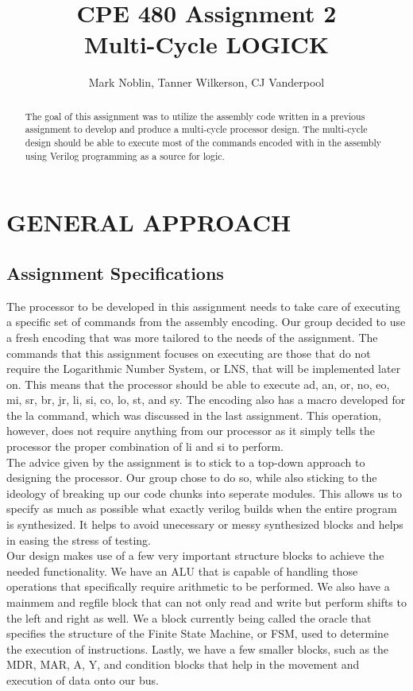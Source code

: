 \documentclass[journal]{IEEEtran}
\begin{document}
\title{CPE 480 Assignment 2\\Multi-Cycle LOGICK}

\author{
Mark Noblin, Tanner Wilkerson, CJ Vanderpool
}
\maketitle

\begin{abstract}
The goal of this assignment was to utilize the assembly code written in a previous assignment to develop and produce a multi-cycle processor design. The multi-cycle design should be able to execute most of the commands encoded with in the assembly using Verilog programming as a source for logic.
\end{abstract}

\section{GENERAL APPROACH}
\subsection{Assignment Specifications}
	The processor to be developed in this assignment needs to take care of executing a specific set of commands from the assembly encoding. Our group decided to use a fresh encoding that was more tailored to the needs of the assignment. The commands that this assignment focuses on executing are those that do not require the Logarithmic Number System, or LNS, that will be implemented later on. This means that the processor should be able to execute ad, an, or, no, eo, mi, sr, br, jr, li, si, co, lo, st, and sy. The encoding also has a macro developed for the la command, which was discussed in the last assignment. This operation, however, does not require anything from our processor as it simply tells the processor the proper combination of li and si to perform.\\
	
	The advice given by the assignment is to stick to a top-down approach to designing the processor. Our group chose to do so, while also sticking to the ideology of breaking up our code chunks into seperate modules. This allows us to specify as much as possible what exactly verilog builds when the entire program is synthesized. It helps to avoid unecessary or messy synthesized blocks and helps in easing the stress of testing.\\
	
	Our design makes use of a few very important structure blocks to achieve the needed functionality. We have an ALU that is capable of handling those operations that specifically require arithmetic to be performed. We also have a mainmem and regfile block that can not only read and write but perform shifts to the left and right as well. We a block currently being called the oracle that specifies the structure of the Finite State Machine, or FSM, used to determine the execution of instructions. Lastly, we have a few smaller blocks, such as the MDR, MAR, A, Y, and condition blocks that help in the movement and execution of data onto our bus.\\
	
\end{document}
